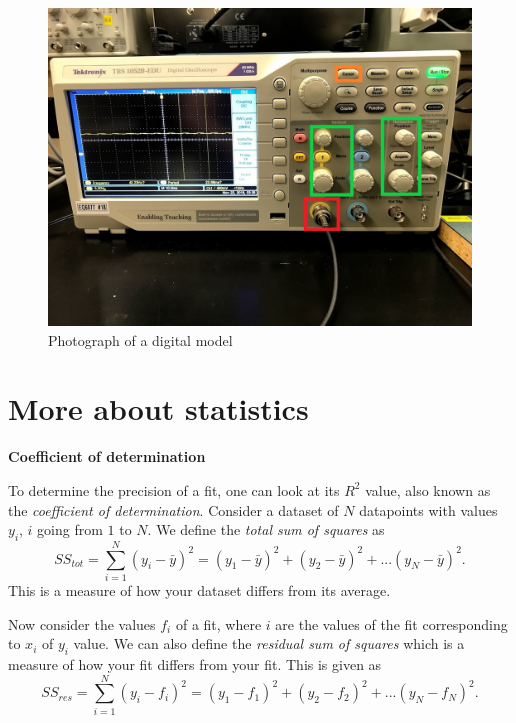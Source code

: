 \documentclass[12pt]{report}
\begin{document}
\begin{appendix}

\begin{figure}[h]
	\centering
	\includegraphics[scale=0.5]{appendix-digosc-label-pic.jpg}
	\caption{Photograph of a digital model}
	\label{Fig:Appendix-Osc}
\end{figure}

\chapter{More about statistics} \label{App:R2}

\noindent \large \textbf{Coefficient of determination} \normalsize

To determine the precision of a fit, one can look at its $R^2$ value, also known as the \textit{coefficient of determination}. Consider a dataset of $N$ datapoints with values $y_i$, $i$ going from $1$ to $N$. We define the \textit{total sum of squares} as
\begin{equation}
SS_{tot} = \displaystyle \sum_{i=1}^N (y_i - \bar{y})^2 = (y_1 - \bar{y})^2 + (y_2 - \bar{y})^2 + ... (y_N - \bar{y})^2.
\end{equation}
This is a measure of how your dataset differs from its average.

Now consider the values $f_i$ of a fit, where $i$ are the values of the fit corresponding to $x_i$ of $y_i$ value. We can also define the \textit{residual sum of squares} which is a measure of how your fit differs from your fit. This is given as
\begin{equation}
SS_{res} = \displaystyle \sum_{i=1}^{N} (y_i - f_i)^2 = (y_1 - f_1)^2 + (y_2 - f_2)^2 + ... (y_N - f_N)^2.
\end{equation}


\end{appendix}
\end{document}
